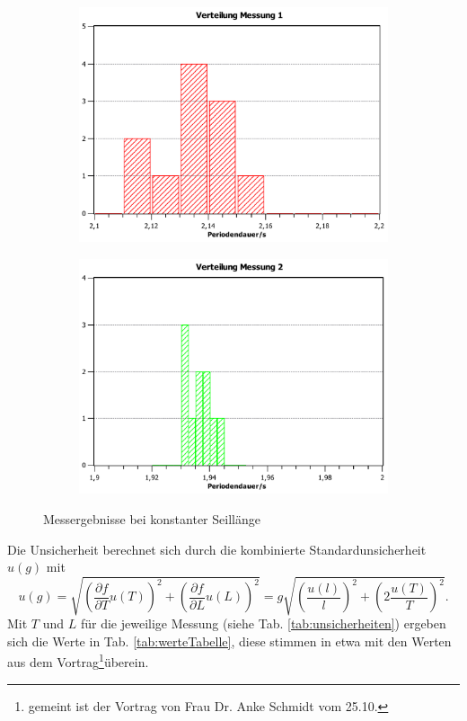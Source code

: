 \documentclass[11pt,a4paper,titlepage, ngerman]{article}
\begin{document}
			\begin{figure}[ht]
				\begin{subfigure}{0.5\textwidth}
					\centering
					\includegraphics[scale=0.35]{VerteilungMessung1.pdf}
				\end{subfigure}
				\begin{subfigure}{0.5\textwidth}
					\centering
					\includegraphics[scale=0.35]{VerteilungMessung2.pdf}
				\end{subfigure}		
				\caption{Messergebnisse bei konstanter Seillänge}
				\label{fig:seilKonst}
			\end{figure}
		
			Die Unsicherheit berechnet sich durch die kombinierte Standardunsicherheit $u(g)$ mit
			\begin{equation*}
				u(g) = \sqrt{
				\left( \frac{\partial f}{\partial T} u(T) \right)^2 +
				\left( \frac{\partial f}{\partial L} u(L) \right)^2
				}
				= g \sqrt{\left(\frac{u(l)}{l}\right)^2 + \left(2\frac{u(T)}{T}\right)^2}.
			\end{equation*}
			Mit $T$ und $L$ für die jeweilige Messung (siehe Tab. \ref{tab:unsicherheiten}) ergeben sich die Werte in Tab. \ref{tab:werteTabelle}, diese stimmen in etwa mit den Werten aus dem Vortrag\footnote{gemeint ist der Vortrag von Frau Dr. Anke Schmidt vom 25.10.}überein.
			
\end{document}
